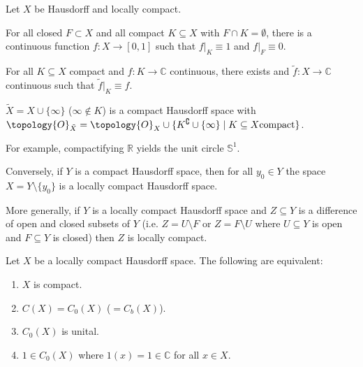 \documentclass[a4paper]{article}
\begin{document}
Let $X$ be Hausdorff and locally compact.

\begin{proposition}
	For all closed $F \subset X$ and all compact $K \subseteq X$ with $F \cap K = \emptyset$, there is a continuous function $f: X \to [0,1]$ such that $f|_K \equiv 1$ and $f|_F \equiv 0$.
\end{proposition}

\begin{proposition}
	For all $K \subseteq X$ compact and $f: K \to \mathds{C}$ continuous, there exists and $\tilde f: X \to \mathds{C}$ continuous such that $\tilde f|_K \equiv f$.
\end{proposition}

\begin{proposition}
	$\tilde X = X \cup \{\infty\}$ ($\infty \notin K$) is a compact Hausdorff space with $\topology{O}_{\tilde X} = \topology{O}_X \cup \{ K^\complement \cup \{\infty\} \mid K \subseteq X \text{compact} \}$.

	For example, compactifying $\mathds{R}$ yields the unit circle $\mathds{S}^1$.
\end{proposition}

\begin{proposition}
	Conversely, if $Y$ is a compact Hausdorff space, then for all $y_0 \in Y$ the space $X = Y \setminus \{ y_0 \}$ is a locally compact Hausdorff space.
\end{proposition}

\begin{proposition}
	More generally, if $Y$ is a locally compact Hausdorff space and $Z \subseteq Y$ is a difference of open and closed subsets of $Y$ (i.e. $Z = U \setminus F$ or $Z = F \setminus U$ where $U \subseteq Y$ is open and $F \subseteq Y$ is closed) then $Z$ is locally compact.
\end{proposition}

\begin{exercise}
	Let $X$ be a locally compact Hausdorff space. The following are equivalent:
	\begin{enumerate}[label=(\arabic*)]
		\item $X$ is compact.
		\item $C(X) = C_0(X)$ ($=C_b(X)$).
		\item $C_0(X)$ is unital.
		\item $1 \in C_0(X)$ where $1(x) = 1 \in \mathds{C}$ for all $x \in X$. 
	\end{enumerate}
\end{exercise}
\end{document}

